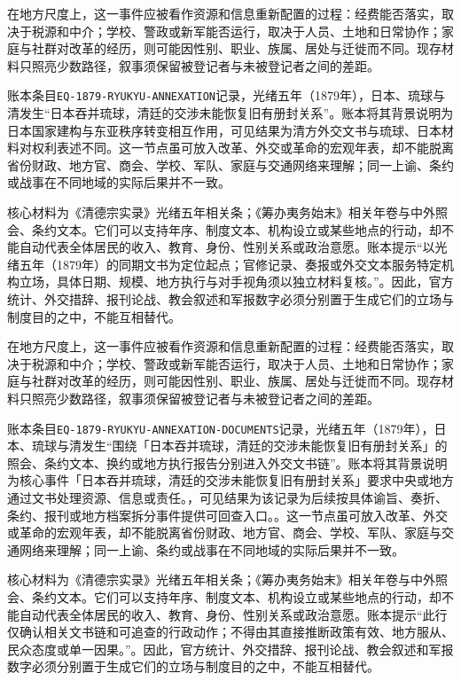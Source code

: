 在地方尺度上，这一事件应被看作资源和信息重新配置的过程：经费能否落实，取决于税源和中介；学校、警政或新军能否运行，取决于人员、土地和日常协作；家庭与社群对改革的经历，则可能因性别、职业、族属、居处与迁徙而不同。现存材料只照亮少数路径，叙事须保留被登记者与未被登记者之间的差距。

账本条目\texttt{EQ-1879-RYUKYU-ANNEXATION}记录，光绪五年（1879年），日本、琉球与清发生“日本吞并琉球，清廷的交涉未能恢复旧有册封关系”。账本将其背景说明为日本国家建构与东亚秩序转变相互作用，可见结果为清方外交文书与琉球、日本材料对权利表述不同。这一节点虽可放入改革、外交或革命的宏观年表，却不能脱离省份财政、地方官、商会、学校、军队、家庭与交通网络来理解；同一上谕、条约或战事在不同地域的实际后果并不一致。

核心材料为《清德宗实录》光绪五年相关条；《筹办夷务始末》相关年卷与中外照会、条约文本。它们可以支持年序、制度文本、机构设立或某些地点的行动，却不能自动代表全体居民的收入、教育、身份、性别关系或政治意愿。账本提示“以光绪五年（1879年）的同期文书为定位起点；官修记录、奏报或外交文本服务特定机构立场，具体日期、规模、地方执行与对手视角须以独立材料复核。”。因此，官方统计、外交措辞、报刊论战、教会叙述和军报数字必须分别置于生成它们的立场与制度目的之中，不能互相替代。

在地方尺度上，这一事件应被看作资源和信息重新配置的过程：经费能否落实，取决于税源和中介；学校、警政或新军能否运行，取决于人员、土地和日常协作；家庭与社群对改革的经历，则可能因性别、职业、族属、居处与迁徙而不同。现存材料只照亮少数路径，叙事须保留被登记者与未被登记者之间的差距。

账本条目\texttt{EQ-1879-RYUKYU-ANNEXATION-DOCUMENTS}记录，光绪五年（1879年），日本、琉球与清发生“围绕「日本吞并琉球，清廷的交涉未能恢复旧有册封关系」的照会、条约文本、换约或地方执行报告分别进入外交文书链”。账本将其背景说明为核心事件「日本吞并琉球，清廷的交涉未能恢复旧有册封关系」要求中央或地方通过文书处理资源、信息或责任。，可见结果为该记录为后续按具体谕旨、奏折、条约、报刊或地方档案拆分事件提供可回查入口。。这一节点虽可放入改革、外交或革命的宏观年表，却不能脱离省份财政、地方官、商会、学校、军队、家庭与交通网络来理解；同一上谕、条约或战事在不同地域的实际后果并不一致。

核心材料为《清德宗实录》光绪五年相关条；《筹办夷务始末》相关年卷与中外照会、条约文本。它们可以支持年序、制度文本、机构设立或某些地点的行动，却不能自动代表全体居民的收入、教育、身份、性别关系或政治意愿。账本提示“此行仅确认相关文书链和可追查的行政动作；不得由其直接推断政策有效、地方服从、民众态度或单一因果。”。因此，官方统计、外交措辞、报刊论战、教会叙述和军报数字必须分别置于生成它们的立场与制度目的之中，不能互相替代。

